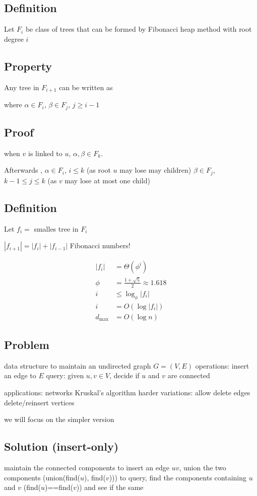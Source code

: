 \documentclass[english,12pt]{article}
\theoremstyle{plain}
\theoremstyle{definition}
\theoremstyle{definition} %
\begin{document}
\subsection{Definition}
Let $F_i$ be class of trees that can be formed by Fibonacci heap method with root degree $i$

\subsection{Property}
Any tree in $F_{i+1}$ can be written as

where $\alpha\in F_i$, $\beta\in F_j$, $j\ge i-1$

\subsection{Proof}
when $v$ is linked to $u$, $\alpha, \beta\in F_k$.

Afterwards , $\alpha\in F_i$, $i\le k$ (as root $u$ may lose may children)
$\beta\in F_j$, $k-1\le j\le k$ (as $v$ may lose at most one child)

\subsection{Definition}
Let $f_i=$ smalles tree in $F_i$

$|f_{i+1}|=|f_i|+|f_{i-1}|$ Fibonacci numbers!

\begin{align*}
|f_i|&=\Theta(\phi^i)\\
\phi &= \frac{1+\sqrt{5}}{2}\approx 1.618\\
i&\le \log_\phi|f_i|\\
i&=O(\log|f_i|)\\
d_{\text{max}}&=O(\log n)
\end{align*}

\subsection{Problem}
data structure to maintain an undirected graph $G=(V,E)$
operations: insert an edge to $E$
query: given $u,v\in V$, decide if $u$ and $v$ are connected

applications:
networks
Kruskal's algorithm
harder variations:
allow delete edges
delete/reinsert vertices

we will focus on the simpler version

\subsection{Solution (insert-only)}
maintain the connected components to insert an edge $uv$, union the two components (union(find($u$), find($v$))) to query, find the components containing $u$ and $v$ (find($u$)==find($v$)) and see if the same
\end{document}
